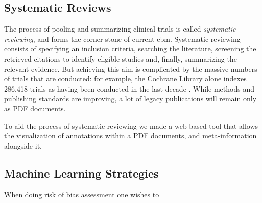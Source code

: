 \documentclass[runningheads,a4paper]{llncs}
\begin{document}
\subsection{Systematic Reviews}
The process of pooling and summarizing clinical trials is called \emph{systematic reviewing}, and forms the corner-stone of current \ac{ebm}.
Systematic reviewing consists of specifying an inclusion criteria, searching the literature, screening the retrieved citations to identify eligible studies and, finally, summarizing the relevant evidence.
But achieving this aim is complicated by the massive numbers of trials that are conducted: for example, the Cochrane Library alone indexes 286,418 trials as having been conducted in the last decade \cite{valkenhoef2012}.
While methods and publishing standards are improving, a lot of legacy publications will remain only as PDF documents.

To aid the process of systematic reviewing we made a web-based tool that allows the visualization of annotations within a PDF documents, and meta-information alongside it.

\subsection{Machine Learning Strategies}
When doing risk of bias assessment one wishes to 

\end{document}
